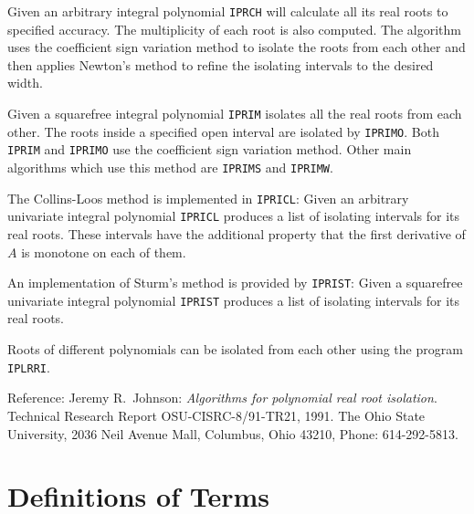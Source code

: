 Given an arbitrary integral polynomial {\tt IPRCH} will calculate all its
real roots to specified accuracy.
%
The multiplicity of each root is also computed.
%
The algorithm uses the coefficient sign variation method to isolate the roots
from each other and then applies Newton's method to refine the isolating intervals
to the desired width.

Given a squarefree integral polynomial {\tt IPRIM} isolates all the real roots
from each other.
The roots inside a specified open interval are isolated by {\tt IPRIMO}.
Both {\tt IPRIM} and {\tt IPRIMO} use the coefficient sign variation method.
Other main algorithms which use this method are {\tt IPRIMS} and {\tt IPRIMW}.

The Collins-Loos method is implemented in {\tt IPRICL}:
%
Given an arbitrary univariate integral polynomial {\tt IPRICL} produces a list of
isolating intervals for its real roots.
%
These intervals have the additional property that the first derivative of $A$
is monotone on each of them.

An implementation of Sturm's method is provided by {\tt IPRIST}:
Given a squarefree univariate integral polynomial {\tt IPRIST} produces a list
of isolating intervals for its real roots.

Roots of different polynomials can be isolated from each other using the program
{\tt IPLRRI}.


Reference:
%
Jeremy R.\ Johnson:
{\it Algorithms for polynomial real root isolation}.
Technical Research Report OSU-CISRC-8/91-TR21, 1991.
The Ohio State University,
2036 Neil Avenue Mall,
Columbus, Ohio 43210,
Phone: 614-292-5813.
%

\section{Definitions of Terms}


